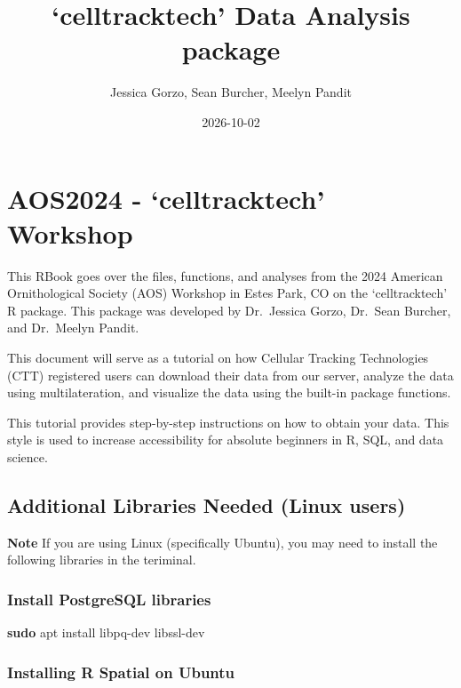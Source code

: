 \documentclass[
]{book}
\title{`celltracktech' Data Analysis package}
\author{Jessica Gorzo, Sean Burcher, Meelyn Pandit}
\date{2026-10-02}
\newenvironment{Shaded}{\begin{snugshade}}{\end{snugshade}}
\newcommand{\FunctionTok}[1]{\textcolor[rgb]{0.13,0.29,0.53}{\textbf{#1}}}
\newcommand{\NormalTok}[1]{#1}
\begin{document}
\maketitle

{
\setcounter{tocdepth}{1}
\tableofcontents
}
\chapter*{AOS2024 - `celltracktech' Workshop}\label{aos2024---celltracktech-workshop}

This RBook goes over the files, functions, and analyses from the 2024 American Ornithological Society (AOS) Workshop in Estes Park, CO on the `celltracktech' R package. This package was developed by Dr.~Jessica Gorzo, Dr.~Sean Burcher, and Dr.~Meelyn Pandit.

This document will serve as a tutorial on how Cellular Tracking Technologies (CTT) registered users can download their data from our server, analyze the data using multilateration, and visualize the data using the built-in package functions.

This tutorial provides step-by-step instructions on how to obtain your data. This style is used to increase accessibility for absolute beginners in R, SQL, and data science.

\section{Additional Libraries Needed (Linux users)}\label{additional-libraries-needed-linux-users}

\textbf{Note} If you are using Linux (specifically Ubuntu), you may need to install the following libraries in the teriminal.

\subsection{Install PostgreSQL libraries}\label{install-postgresql-libraries}

\begin{Shaded}
\begin{Highlighting}[]
\FunctionTok{sudo}\NormalTok{ apt install libpq{-}dev libssl{-}dev}
\end{Highlighting}
\end{Shaded}

\subsection{Installing R Spatial on Ubuntu}\label{installing-r-spatial-on-ubuntu}
\end{document}
